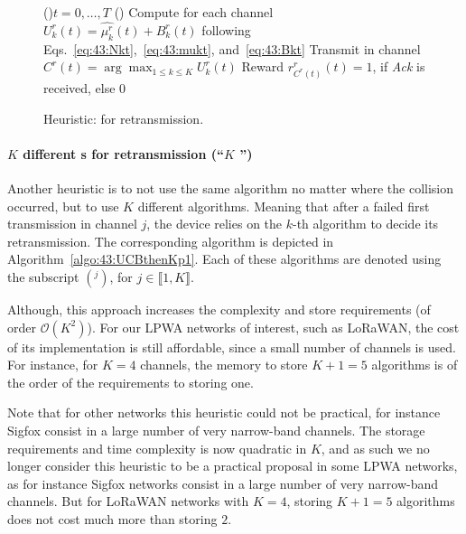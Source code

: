 \vspace*{-3pt}
\begin{figure}[h!]
	\centering
	\begin{algorithm}[H]
		\For(){$t = 0, \dots, T$}{
			\Else(){
				Compute for each channel $U^r_k(t) = \widehat{\mu^r_k}(t) + B^r_k(t)$ following Eqs.~\eqref{eq:43:Nkt},~\eqref{eq:43:mukt}, and~\eqref{eq:43:Bkt}\;
				Transmit in channel $C^r(t) = \arg\max_{1\leq k \leq K} U^r_k(t)$\;
				Reward $r^r_{C^r(t)}(t) = 1$, if \emph{Ack} is received, else $0$\;
			}
		}
		\caption{Heuristic: \UCB{} for retransmission.}    %
		\label{algo:43:TwoUCB}
		\end{algorithm}
\end{figure}

\paragraph{$K$ different {\UCB}s for retransmission (``$K$ \UCB{}'')}\label{sub:43:UCBthenKp1}

Another heuristic is to not use the same algorithm no matter where the collision occurred, but to use $K$ different \UCB{} algorithms.
Meaning that after a failed first transmission in channel $j$, the device relies on the $k$-th algorithm to decide its retransmission.
The corresponding algorithm is depicted in Algorithm~\ref{algo:43:UCBthenKp1}.
Each of these algorithms are denoted using the subscript $({}^{j})$, for $j\in\llbracket 1, K \rrbracket$.

Although, this approach increases the complexity and store requirements (of order $\mathcal{O}(K^2)$).
For our LPWA networks of interest, such as LoRaWAN, the cost of its implementation is still affordable, since a small number of channels is used.
For instance, for $K=4$ channels,
the memory to store $K+1=5$ algorithms is of the order of the requirements to storing one.

Note that for other networks this heuristic could not be practical, for instance Sigfox consist in a large number of very narrow-band channels.
The storage requirements and time complexity is now quadratic in $K$, and as such we no longer consider this heuristic to be a practical proposal in some LPWA networks, as for instance Sigfox networks consist in a large number of very narrow-band channels. But for LoRaWAN networks with $K=4$, storing $K+1=5$ algorithms does not cost much more than storing $2$.

